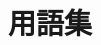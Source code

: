 \documentclass[dvipdfmx]{ampbt}
\begin{document}
\section{用語集}

\printglossaries


\fi
\ifoutputcover
\evenclearpage
\makecover                      %
\makespine[1]                   %
\makeinsidecover                %
\fi
\ifoutputabstractforsubmission
\makeabstractforsubmission      %
\fi
\end{document}
